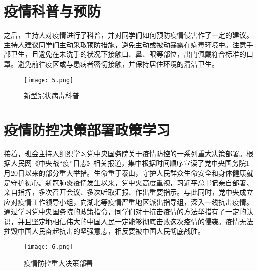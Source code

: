 \documentclass[UTF8]{ctexart}
\begin{document}
	\title{\vspace{2em}}
	\section*{疫情科普与预防}
	\title{\vspace{1em}}
	\par{之后，主持人对疫情进行了科普，并对同学们如何预防疫情侵害作了一定的建议。主持人建议同学们主动采取预防措施，避免主动或被动暴露在病毒环境中。注意手部卫生，且避免在未洗手的状况下接触口、鼻、眼等部位，出门佩戴符合标准的口罩。避免前往疫区或与患病者密切接触，并保持居住环境的清洁卫生。}	
	\title{\vspace{1em}}
	\begin{figure}[H]
		\centering
		\begin{center}{}
			\begin{minipage}[t]{4.5in}
				\texttt{[image: 5.png]}
				\caption*{\kaishu 新型冠状病毒科普}
			\end{minipage}
		\end{center}
	\end{figure}
	
	\title{\vspace{2em}}
	\section*{疫情防控决策部署政策学习}
	\title{\vspace{1em}}
	\par{接着，班会主持人组织学习党中央国务院关于疫情防控的一系列重大决策部署。根据人民网《中央战“疫”日志》相关报道，集中根据时间顺序宣读了党中央国务院1月20日以来的部分重大举措。生命重于泰山，守护人民群众生命安全和身体健康就是守护初心。新冠肺炎疫情发生以来，党中央高度重视，习近平总书记亲自部署、亲自指挥，多次召开会议、多次听取汇报、作出重要指示。与此同时，党中央成立应对疫情工作领导小组，向湖北等疫情严重地区派出指导组，深入一线抗击疫情。通过学习党中央国务院的政策指令，同学们对于抗击疫情的方法举措有了一定的认识，并且坚定地相信伟大的中国人民一定能够彻底击败这次疫情的侵袭。疫情无法摧毁中国人民奋起抗击的坚强意志，相反要被中国人民彻底战胜。}
	\title{\vspace{1em}}
	\begin{figure}[H]
		\centering
		\begin{center}{}
			\begin{minipage}[t]{4.5in}
				\texttt{[image: 6.png]}
				\caption*{\kaishu 疫情防控重大决策部署}
			\end{minipage}
		\end{center}
	\end{figure}
	
\end{document}
